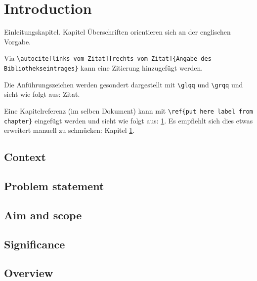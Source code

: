 
\section{Introduction}\label{intro}
Einleitungskapitel. Kapitel Überschriften orientieren sich an der englischen Vorgabe.

Via 
\verb!\autocite[links vom Zitat][rechts vom Zitat]{Angabe des Bibliothekseintrages}! 
kann eine Zitierung hinzugefügt werden.\autocite[links][rechts]{LeCun2015}

Die Anführungszeichen werden gesondert dargestellt mit \verb!\glqq! und \verb!\grqq! und sieht wie folgt aus: \glqq Zitat\grqq.

Eine Kapitelreferenz (im selben Dokument) kann mit \verb!\ref{put here label from chapter}! eingefügt werden und sieht wie folgt aus: \ref{intro}. Es empfiehlt sich dies etwas erweitert manuell zu schmücken: Kapitel \ref{intro}. 

\subsection{Context}

\newpage
\subsection{Problem statement}\label{quest} %



\subsection{Aim and scope}


\subsection{Significance}


\subsection{Overview}
